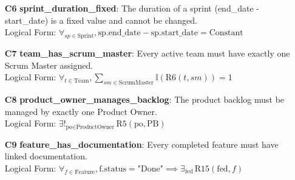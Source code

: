 \documentclass[11pt]{article}
\begin{document}
\begin{itemize}
    \item[\textbf{C6}] \textbf{sprint\_duration\_fixed}: The duration of a sprint (end\_date - start\_date) is a fixed value and cannot be changed. \\
    Logical Form: $\forall_{sp \in \text{Sprint}}, \text{sp.end\_date} - \text{sp.start\_date} = \text{Constant}$

    \item[\textbf{C7}] \textbf{team\_has\_scrum\_master}: Every active team must have exactly one Scrum Master assigned. \\
    Logical Form: $\forall_{t \in \text{Team}}, \sum_{sm \in \text{ScrumMaster}} \mathbb{I}(\text{R6}(t, sm)) = 1$

    \item[\textbf{C8}] \textbf{product\_owner\_manages\_backlog}: The product backlog must be managed by exactly one Product Owner. \\
    Logical Form: $\exists!_{\text{po} \in \text{ProductOwner}} \, \text{R5}(\text{po}, \text{PB})$

    \item[\textbf{C9}] \textbf{feature\_has\_documentation}: Every completed feature must have linked documentation. \\
    Logical Form: $\forall_{f \in \text{Feature}}, \text{f.status} = \text{"Done"} \implies \exists_{\text{fed}} \, \text{R15}(\text{fed}, f)$
\end{itemize}
\end{document}
